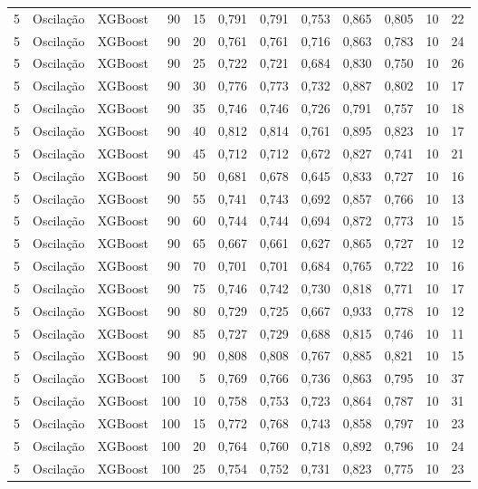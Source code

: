 \begin{longtable}{@{}rllrrrrrrrrr@{}}
5 & Oscilação & XGBoost & 90 & 15 & 0,791 & 0,791 & 0,753 & 0,865 & 0,805 & 10 & 22 \\
5 & Oscilação & XGBoost & 90 & 20 & 0,761 & 0,761 & 0,716 & 0,863 & 0,783 & 10 & 24 \\
5 & Oscilação & XGBoost & 90 & 25 & 0,722 & 0,721 & 0,684 & 0,830 & 0,750 & 10 & 26 \\
5 & Oscilação & XGBoost & 90 & 30 & 0,776 & 0,773 & 0,732 & 0,887 & 0,802 & 10 & 17 \\
5 & Oscilação & XGBoost & 90 & 35 & 0,746 & 0,746 & 0,726 & 0,791 & 0,757 & 10 & 18 \\
5 & Oscilação & XGBoost & 90 & 40 & 0,812 & 0,814 & 0,761 & 0,895 & 0,823 & 10 & 17 \\
5 & Oscilação & XGBoost & 90 & 45 & 0,712 & 0,712 & 0,672 & 0,827 & 0,741 & 10 & 21 \\
5 & Oscilação & XGBoost & 90 & 50 & 0,681 & 0,678 & 0,645 & 0,833 & 0,727 & 10 & 16 \\
5 & Oscilação & XGBoost & 90 & 55 & 0,741 & 0,743 & 0,692 & 0,857 & 0,766 & 10 & 13 \\
5 & Oscilação & XGBoost & 90 & 60 & 0,744 & 0,744 & 0,694 & 0,872 & 0,773 & 10 & 15 \\
5 & Oscilação & XGBoost & 90 & 65 & 0,667 & 0,661 & 0,627 & 0,865 & 0,727 & 10 & 12 \\
5 & Oscilação & XGBoost & 90 & 70 & 0,701 & 0,701 & 0,684 & 0,765 & 0,722 & 10 & 16 \\
5 & Oscilação & XGBoost & 90 & 75 & 0,746 & 0,742 & 0,730 & 0,818 & 0,771 & 10 & 17 \\
5 & Oscilação & XGBoost & 90 & 80 & 0,729 & 0,725 & 0,667 & 0,933 & 0,778 & 10 & 12 \\
5 & Oscilação & XGBoost & 90 & 85 & 0,727 & 0,729 & 0,688 & 0,815 & 0,746 & 10 & 11 \\
5 & Oscilação & XGBoost & 90 & 90 & 0,808 & 0,808 & 0,767 & 0,885 & 0,821 & 10 & 15 \\
5 & Oscilação & XGBoost & 100 & 5 & 0,769 & 0,766 & 0,736 & 0,863 & 0,795 & 10 & 37 \\
5 & Oscilação & XGBoost & 100 & 10 & 0,758 & 0,753 & 0,723 & 0,864 & 0,787 & 10 & 31 \\
5 & Oscilação & XGBoost & 100 & 15 & 0,772 & 0,768 & 0,743 & 0,858 & 0,797 & 10 & 23 \\
5 & Oscilação & XGBoost & 100 & 20 & 0,764 & 0,760 & 0,718 & 0,892 & 0,796 & 10 & 24 \\
5 & Oscilação & XGBoost & 100 & 25 & 0,754 & 0,752 & 0,731 & 0,823 & 0,775 & 10 & 23 \\

\end{longtable}
